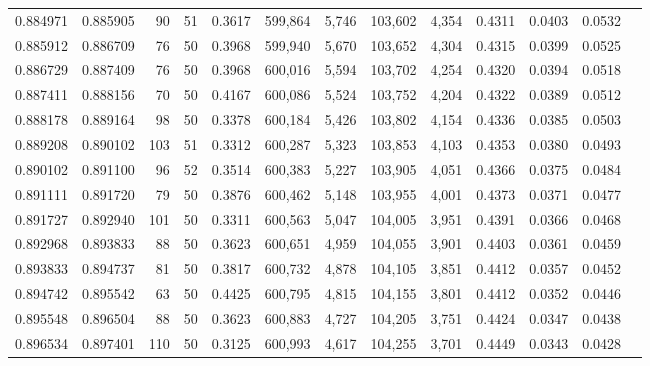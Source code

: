 \begin{tabular}{rrrrrrrrrrrrr}
0.884971 & 0.885905 &    90 &  51 &                                     0.3617 & 599,864 &   5,746 & 103,602 &   4,354 & 0.4311 & 0.0403 & 0.0532 \\
0.885912 & 0.886709 &    76 &  50 &                                     0.3968 & 599,940 &   5,670 & 103,652 &   4,304 & 0.4315 & 0.0399 & 0.0525 \\
0.886729 & 0.887409 &    76 &  50 &                                     0.3968 & 600,016 &   5,594 & 103,702 &   4,254 & 0.4320 & 0.0394 & 0.0518 \\
0.887411 & 0.888156 &    70 &  50 &                                     0.4167 & 600,086 &   5,524 & 103,752 &   4,204 & 0.4322 & 0.0389 & 0.0512 \\
0.888178 & 0.889164 &    98 &  50 &                                     0.3378 & 600,184 &   5,426 & 103,802 &   4,154 & 0.4336 & 0.0385 & 0.0503 \\
0.889208 & 0.890102 &   103 &  51 &                                     0.3312 & 600,287 &   5,323 & 103,853 &   4,103 & 0.4353 & 0.0380 & 0.0493 \\
0.890102 & 0.891100 &    96 &  52 &                                     0.3514 & 600,383 &   5,227 & 103,905 &   4,051 & 0.4366 & 0.0375 & 0.0484 \\
0.891111 & 0.891720 &    79 &  50 &                                     0.3876 & 600,462 &   5,148 & 103,955 &   4,001 & 0.4373 & 0.0371 & 0.0477 \\
0.891727 & 0.892940 &   101 &  50 &                                     0.3311 & 600,563 &   5,047 & 104,005 &   3,951 & 0.4391 & 0.0366 & 0.0468 \\
0.892968 & 0.893833 &    88 &  50 &                                     0.3623 & 600,651 &   4,959 & 104,055 &   3,901 & 0.4403 & 0.0361 & 0.0459 \\
0.893833 & 0.894737 &    81 &  50 &                                     0.3817 & 600,732 &   4,878 & 104,105 &   3,851 & 0.4412 & 0.0357 & 0.0452 \\
0.894742 & 0.895542 &    63 &  50 &                                     0.4425 & 600,795 &   4,815 & 104,155 &   3,801 & 0.4412 & 0.0352 & 0.0446 \\
0.895548 & 0.896504 &    88 &  50 &                                     0.3623 & 600,883 &   4,727 & 104,205 &   3,751 & 0.4424 & 0.0347 & 0.0438 \\
0.896534 & 0.897401 &   110 &  50 &                                     0.3125 & 600,993 &   4,617 & 104,255 &   3,701 & 0.4449 & 0.0343 & 0.0428 \\

\end{tabular}
